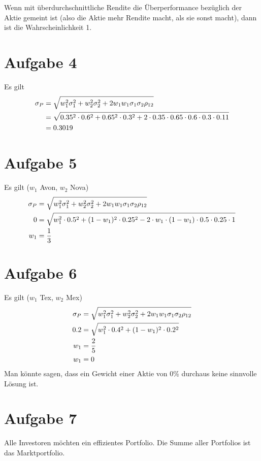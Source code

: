 \documentclass{article}
\begin{document}
	Wenn mit überdurchschnittliche Rendite die Überperformance bezüglich der Aktie gemeint ist (also die Aktie mehr Rendite macht, als sie sonst macht), dann ist die Wahrscheinlichkeit 1.
	
	\section*{Aufgabe 4}
	Es gilt
	\begin{align}
		\sigma_P &= \sqrt{w_1^2\sigma_1^2 + w_2^2\sigma_2^2 + 2w_1w_1\sigma_1\sigma_2\rho_{12}} \notag \\
		&= \sqrt{0.35^2\cdot 0.6^2 + 0.65^2\cdot 0.3^2 + 2\cdot 0.35\cdot 0.65\cdot 0.6\cdot 0.3\cdot 0.11} \notag \\
		&= 0.3019 \notag
	\end{align}
	
	\section*{Aufgabe 5}
	Es gilt ($w_1$ Avon, $w_2$ Nova)
	\begin{align}
		\sigma_P &= \sqrt{w_1^2\sigma_1^2 + w_2^2\sigma_2^2 + 2w_1w_1\sigma_1\sigma_2\rho_{12}} \notag \\
		0 &= \sqrt{w_1^2\cdot 0.5^2 + (1-w_1)^2\cdot 0.25^2 - 2\cdot w_1\cdot (1-w_1)\cdot 0.5\cdot 0.25\cdot 1} \notag \\
		w_1 &= \frac{1}{3} \notag
	\end{align}
	
	\section*{Aufgabe 6}
	Es gilt ($w_1$ Tex, $w_2$ Mex)
	\begin{align}
		\sigma_P &= \sqrt{w_1^2\sigma_1^2 + w_2^2\sigma_2^2 + 2w_1w_1\sigma_1\sigma_2\rho_{12}} \notag \\
		0.2 &= \sqrt{w_1^2\cdot 0.4^2 + (1-w_1)^2\cdot 0.2^2} \notag \\
		w_1 &= \frac{2}{5} \notag \\
		w_1 &= 0 \notag
	\end{align}
	Man könnte sagen, dass ein Gewicht einer Aktie von 0\% durchaus keine sinnvolle Lösung ist. 
	
	\section*{Aufgabe 7}
	Alle Investoren möchten ein effizientes Portfolio. Die Summe aller Portfolios ist das Marktportfolio.
	
\end{document}
